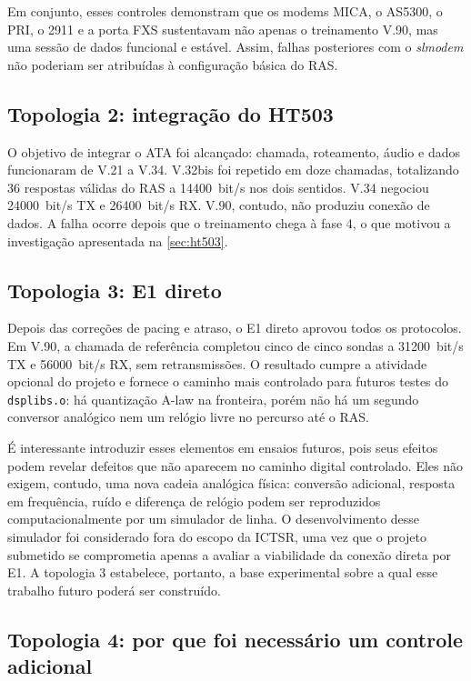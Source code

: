 \documentclass[12pt,a4paper]{article}
\newcommand{\slmodem}{\textit{slmodem}}
\newcommand{\dsplibs}{\texttt{dsplibs.o}}
\begin{document}
Em conjunto, esses controles demonstram que os modems MICA, o AS5300, o PRI, o
2911 e a porta FXS sustentavam não apenas o treinamento V.90, mas uma sessão de
dados funcional e estável. Assim, falhas posteriores com o \slmodem{} não poderiam
ser atribuídas à configuração básica do RAS.

\subsection{Topologia 2: integração do HT503}

O objetivo de integrar o ATA foi alcançado: chamada, roteamento, áudio e dados
funcionaram de V.21 a V.34. V.32bis foi repetido em doze chamadas, totalizando 36
respostas válidas do RAS a \SI{14400}{bit/s} nos dois sentidos. V.34 negociou
\SI{24000}{bit/s} TX e \SI{26400}{bit/s} RX. V.90, contudo, não produziu
conexão de dados. A falha ocorre depois que o treinamento chega à fase 4, o que
motivou a investigação apresentada na \cref{sec:ht503}.

\subsection{Topologia 3: E1 direto}

Depois das correções de pacing e atraso, o E1 direto aprovou todos os protocolos.
Em V.90, a chamada de referência completou cinco de cinco sondas a
\SI{31200}{bit/s} TX e \SI{56000}{bit/s} RX, sem retransmissões. O
resultado cumpre a atividade opcional do projeto e fornece o caminho mais controlado
para futuros testes do \dsplibs: há quantização A-law na fronteira, porém não há
um segundo conversor analógico nem um relógio livre no percurso até o RAS.

É interessante introduzir esses elementos em ensaios futuros, pois seus efeitos
podem revelar defeitos que não aparecem no caminho digital controlado. Eles não
exigem, contudo, uma nova cadeia analógica física: conversão adicional, resposta em
frequência, ruído e diferença de relógio podem ser reproduzidos computacionalmente
por um simulador de linha. O desenvolvimento desse simulador foi considerado fora
do escopo da ICTSR, uma vez que o projeto submetido se comprometia apenas a avaliar
a viabilidade da conexão direta por E1. A topologia 3 estabelece, portanto, a base
experimental sobre a qual esse trabalho futuro poderá ser construído.

\subsection{Topologia 4: por que foi necessário um controle adicional}
\end{document}
